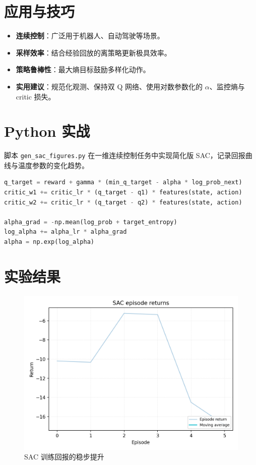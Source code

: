 \documentclass[UTF8,zihao=-4]{ctexart}
\begin{document}
\section{应用与技巧}
\begin{itemize}
  \item \textbf{连续控制}：广泛用于机器人、自动驾驶等场景。
  \item \textbf{采样效率}：结合经验回放的离策略更新极具效率。
  \item \textbf{策略鲁棒性}：最大熵目标鼓励多样化动作。
  \item \textbf{实用建议}：规范化观测、保持双 Q 网络、使用对数参数化的 \(\alpha\)、监控熵与 critic 损失。
\end{itemize}

\section{Python 实战}
脚本 \texttt{gen\_sac\_figures.py} 在一维连续控制任务中实现简化版 SAC，记录回报曲线与温度参数的变化趋势。
\begin{lstlisting}[language=Python,caption={脚本 gen_sac_figures.py 片段}]
q_target = reward + gamma * (min_q_target - alpha * log_prob_next)
critic_w1 += critic_lr * (q_target - q1) * features(state, action)
critic_w2 += critic_lr * (q_target - q2) * features(state, action)

alpha_grad = -np.mean(log_prob + target_entropy)
log_alpha += alpha_lr * alpha_grad
alpha = np.exp(log_alpha)
\end{lstlisting}

\section{实验结果}
\begin{figure}[H]
  \centering
  \includegraphics[width=0.8\linewidth]{sac_returns.png}
  \caption{SAC 训练回报的稳步提升}
  \label{fig:sac_returns_cn}
\end{figure}
\end{document}

